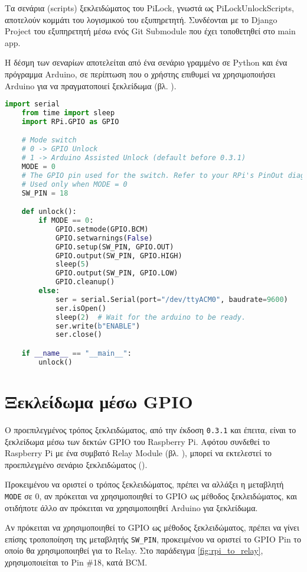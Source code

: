 Τα σενάρια (scripts) ξεκλειδώματος του PiLock, γνωστά ως PiLockUnlockScripts, αποτελούν κομμάτι του λογισμικού του εξυπηρετητή. Συνδέονται με το Django Project του εξυπηρετητή μέσω ενός Git Submodule που έχει τοποθετηθεί στο main app.

Η δέσμη των σεναρίων αποτελείται από ένα σενάριο γραμμένο σε Python και ένα πρόγραμμα Arduino, σε περίπτωση που ο χρήστης επιθυμεί να χρησιμοποιήσει Arduino για να πραγματοποιεί ξεκλείδωμα (βλ. ).

\begin{lstlisting}[language=python, caption=Σενάριο Ξεκλειδώματος Python, label={lst:python_unlockscript}]
	import serial
	from time import sleep
	import RPi.GPIO as GPIO

	# Mode switch
	# 0 -> GPIO Unlock
	# 1 -> Arduino Assisted Unlock (default before 0.3.1)
	MODE = 0
	# The GPIO pin used for the switch. Refer to your RPi's PinOut diagram.
	# Used only when MODE = 0 
	SW_PIN = 18 

	def unlock():
	    if MODE == 0:
	        GPIO.setmode(GPIO.BCM)
	        GPIO.setwarnings(False)
	        GPIO.setup(SW_PIN, GPIO.OUT)
	        GPIO.output(SW_PIN, GPIO.HIGH)
	        sleep(5)
	        GPIO.output(SW_PIN, GPIO.LOW)
	        GPIO.cleanup()
	    else:
	        ser = serial.Serial(port="/dev/ttyACM0", baudrate=9600)
	        ser.isOpen()
	        sleep(2)  # Wait for the arduino to be ready.
	        ser.write(b"ENABLE")
	        ser.close()

	if __name__ == "__main__":
	    unlock()\end{lstlisting}

\section{Ξεκλείδωμα μέσω GPIO}
	Ο προεπιλεγμένος τρόπος ξεκλειδώματος, από την έκδοση \verb|0.3.1| και έπειτα, είναι το ξεκλείδωμα μέσω των δεκτών GPIO του Raspberry Pi. Αφότου συνδεθεί το Raspberry Pi με ένα συμβατό Relay Module (βλ. ), μπορεί να εκτελεστεί το προεπιλεγμένο σενάριο ξεκλειδώματος ().

	Προκειμένου να οριστεί ο τρόπος ξεκλειδώματος, πρέπει να αλλάξει η μεταβλητή \verb|MODE| σε 0, αν πρόκειται να χρησιμοποιηθεί το GPIO ως μέθοδος ξεκλειδώματος, και οτιδήποτε άλλο αν πρόκειται να χρησιμοποιηθεί Arduino για ξεκλείδωμα.

	Αν πρόκειται να χρησιμοποιηθεί το GPIO ως μέθοδος ξεκλειδώματος, πρέπει να γίνει επίσης τροποποίηση της μεταβλητής \verb|SW_PIN|, προκειμένου να οριστεί το GPIO Pin το οποίο θα χρησιμοποιηθεί για το Relay. Στο παράδειγμα \autoref{fig:rpi_to_relay}, χρησιμοποιείται το Pin \#18, κατά BCM.

